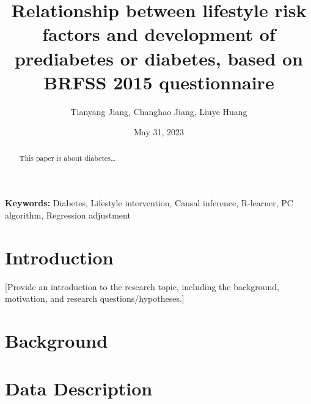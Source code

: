 \documentclass[
  12pt,
]{article}
\title{Relationship between lifestyle risk factors and development of
prediabetes or diabetes, based on BRFSS 2015 questionnaire}
\author{Tianyang Jiang, Changhao Jiang, Liuye Huang}
\date{May 31, 2023}
\begin{document}
\maketitle
\begin{abstract}
This paper is about diabetes\ldots{}
\end{abstract}

\textbf{Keywords:} Diabetes, Lifestyle intervention, Causal inference,
R-learner, PC algorithm, Regression adjustment

\hypertarget{introduction}{%
\section{Introduction}\label{introduction}}

{[}Provide an introduction to the research topic, including the
background, motivation, and research questions/hypotheses.{]}

\hypertarget{background}{%
\section{Background}\label{background}}

\hypertarget{data-description}{%
\section{Data Description}\label{data-description}}
\end{document}
